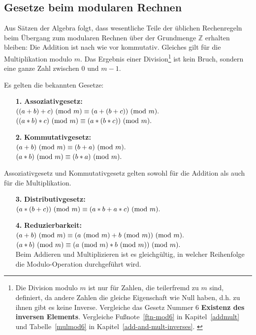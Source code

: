 \begin{refsegment}
\subsection{Gesetze beim modularen Rechnen}
\label{Laws-modular-calcs}

Aus Sätzen der Algebra folgt, dass wesentliche Teile der üblichen
Rechenregeln beim Übergang zum modularen Rechnen über der Grundmenge
$\mathbb{Z}$ erhalten bleiben: Die Addition ist nach wie vor kommutativ.
Gleiches gilt für die Multiplikation modulo $m$. Das Ergebnis einer
Division\footnote{%
Die Division modulo $m$ ist nur für Zahlen, die
teilerfremd zu $m$ sind, definiert, da
andere Zahlen die gleiche Eigenschaft wie Null haben, d.h. zu ihnen gibt es
keine Inverse.
Vergleiche das Gesetz Nummer 6 \textbf{Existenz des inversen Elements}.
Vergleiche Fußnote~\ref{ftn-mod6} in Kapitel~\ref{addmult} und
Tabelle~\ref{mulmod6} in Kapitel~\ref{add-and-mult-inverses}.
\label{ftn-res-divmodn}\label{ftn-zth-divmodn}
} ist kein Bruch, sondern eine ganze Zahl zwischen $0$ und $m-1$.

Es gelten die bekannten Gesetze:
\begin{itemize}
\item[\textbf{1.}] \textbf{Assoziativgesetz:}\\
    $((a+b) + c) {\rm ~(mod~ } m) \equiv  (a + (b+c)) {\rm ~(mod~ } m).$\\
    $((a*b) * c) {\rm ~(mod~ } m) \equiv  (a * (b*c)) {\rm ~(mod~ } m).$
\item[\textbf{2.}] \textbf{Kommutativgesetz:} \\
    $(a+b) {\rm ~(mod~ } m) \equiv  (b+a) {\rm ~(mod~ } m).$\\
     $(a*b) {\rm ~(mod~ } m) \equiv  (b*a) {\rm ~(mod~ } m).$
\end{itemize}
Assoziativgesetz und Kommutativgesetz gelten sowohl für die Addition als auch für die Multiplikation.
\begin{itemize}
\item[\textbf{3.}] \textbf{Distributivgesetz:} \\
    $ (a * (b+c)) {\rm ~(mod~ } m) \equiv  (a*b + a*c) {\rm ~(mod~ } m).$
\item[\textbf{4.}] \textbf{Reduzierbarkeit:} \\
    $(a+b) {\rm ~(mod~} m) \equiv  (a {\rm ~(mod~ } m) + b {\rm ~(mod~ } m)) {\rm ~(mod~} m).$\\
    $(a*b) {\rm ~(mod~} m) \equiv  (a {\rm ~(mod~ } m) * b {\rm ~(mod~ } m)) {\rm ~(mod~} m).$\\
    Beim Addieren und Multiplizieren ist es gleichgültig, in welcher Reihenfolge die Modulo-Operation durchgeführt wird.
\end{itemize}


\end{refsegment}
